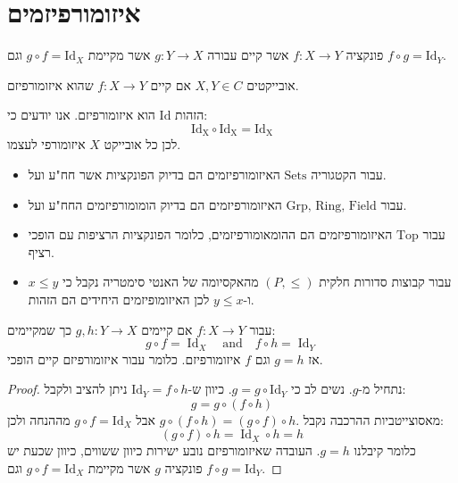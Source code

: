 \documentclass{tstextbook}
\begin{document}
\section{איזומורפיזמים}

\begin{definition}[איזומורפיזם]
פונקציה \(f:X\to Y\) אשר קיים עבורה \(g:Y\to X\) אשר מקיימת \(g\circ f = \mathrm{Id}_{X}\) וגם \(f\circ g = \mathrm{Id}_{Y}\).

\end{definition}
\begin{definition}[איזומורפיים]
אובייקטים \(X,Y \in C\) אם קיים \(f:X\to Y\) שהוא איזומורפיזם.

\end{definition}
\begin{example}
הזהות \(\mathrm{Id}\) הוא איזומורפיזם. אנו יודעים כי:
$$\mathrm{Id_{X}\circ Id_{X}=Id_{X}}$$
לכן כל אובייקט \(X\) איזומורפי לעצמו.

\end{example}
\begin{example}
  \begin{itemize}
    \item עבור הקטגוריה \(\text{Sets}\) האיזומורפיזמים הם בדיוק הפונקציות אשר חח"ע ועל. 
    \item עבור \(\text{Grp, Ring, Field}\) האיזומורפיזמים הם בדיוק הומומורפיזמים החח"ע ועל.
    \item עבור \(\text{Top}\) האיזומורפיזמים הם ההומאומורפיזמים, כלומר הפונקציות הרציפות עם הופכי רציף.
    \item עבור קבוצות סדורות חלקית \(\left( P,\leq \right)\) מהאקסיומה של האנטי סימטריה נקבל כי \(x\leq y\) ו-\(y\leq x\) לכן האיזומופיזמים היחידים הם הזהות.
  \end{itemize}
\end{example}
\begin{proposition}
עבור \(f:X\to Y\) אם קיימים \(g,h:Y\to X\) כך שמקיימים:
$$g\circ f=\operatorname{Id}_{X}\quad{\mathrm{and}}\quad f\circ h=\operatorname{Id}_{Y}$$
אז \(g=h\) וגם \(f\) איזומורפיזם. כלומר עבור איזומורפיזם קיים הופכי.

\end{proposition}
\begin{proof}
נתחיל מ-\(g\). נשים לב כי \(g=g\circ\mathrm{Id}_{Y}\). כיוון ש-\(\mathrm{Id}_{Y}=f\circ h\) ניתן להציב ולקבל:
$$g=g\circ(f\circ h)$$
מאסוצייטביות ההרכבה נקבל \(g\circ(f\circ h)=(g\circ f)\circ h.\) אבל \(g \circ f = \mathrm{Id}_{X}\) מההנחה ולכן:
$$(g\circ f)\circ h=\operatorname{Id}_{X}\circ h=h$$
כלומר קיבלנו \(g=h\). העובדה שאיזומורפיזם נובע ישירות כיוון ששווים, כיוון שכעת יש פונקציה \(g\) אשר מקיימת \(g\circ f = \mathrm{Id}_{X}\) וגם \(f\circ g = \mathrm{Id}_{Y}\).

\end{proof}
\end{document}
